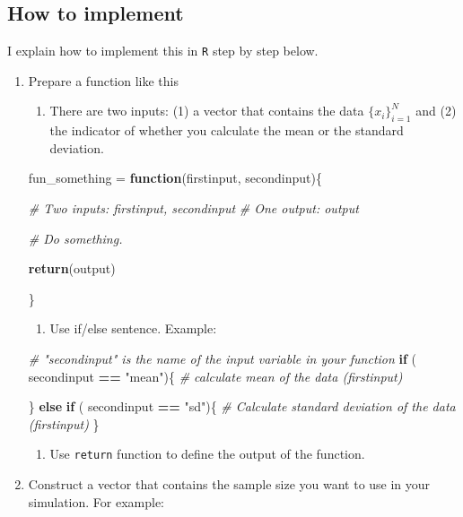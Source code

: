 \documentclass[]{book}
\newenvironment{Shaded}{\begin{snugshade}}{\end{snugshade}}
\newcommand{\CommentTok}[1]{\textcolor[rgb]{0.56,0.35,0.01}{\textit{#1}}}
\newcommand{\ControlFlowTok}[1]{\textcolor[rgb]{0.13,0.29,0.53}{\textbf{#1}}}
\newcommand{\KeywordTok}[1]{\textcolor[rgb]{0.13,0.29,0.53}{\textbf{#1}}}
\newcommand{\NormalTok}[1]{#1}
\newcommand{\OperatorTok}[1]{\textcolor[rgb]{0.81,0.36,0.00}{\textbf{#1}}}
\newcommand{\StringTok}[1]{\textcolor[rgb]{0.31,0.60,0.02}{#1}}
\providecommand{\tightlist}{%
  \setlength{\itemsep}{0pt}\setlength{\parskip}{0pt}}
\begin{document}
\hypertarget{how-to-implement}{%
\subsection{How to implement}\label{how-to-implement}}

I explain how to implement this in \texttt{R} step by step below.

\begin{enumerate}
\def\labelenumi{\arabic{enumi}.}
\tightlist
\item
  Prepare a function like this

  \begin{enumerate}
  \def\labelenumii{\arabic{enumii}.}
  \tightlist
  \item
    There are two inputs: (1) a vector that contains the data \(\{x_{i}\}_{i=1}^{N}\) and (2) the indicator of whether you calculate the mean or the standard deviation.
  \end{enumerate}

\begin{Shaded}
\begin{Highlighting}[]
\NormalTok{fun_something =}\StringTok{ }\ControlFlowTok{function}\NormalTok{(firstinput, secondinput)\{}

  \CommentTok{# Two inputs: firstinput, secondinput}
  \CommentTok{# One output: output}

  \CommentTok{# Do something.}

  \KeywordTok{return}\NormalTok{(output)}

\NormalTok{\}}
\end{Highlighting}
\end{Shaded}

  \begin{enumerate}
  \def\labelenumii{\arabic{enumii}.}
  \setcounter{enumii}{1}
  \tightlist
  \item
    Use if/else sentence. Example:
  \end{enumerate}

\begin{Shaded}
\begin{Highlighting}[]
\CommentTok{# "secondinput" is the name of the input variable in your function}
\ControlFlowTok{if}\NormalTok{ ( secondinput }\OperatorTok{==}\StringTok{ "mean"}\NormalTok{)\{}
  \CommentTok{# calculate mean of the data (firstinput)}

\NormalTok{\} }\ControlFlowTok{else} \ControlFlowTok{if}\NormalTok{ ( secondinput }\OperatorTok{==}\StringTok{ "sd"}\NormalTok{)\{}
  \CommentTok{# Calculate standard deviation of the data (firstinput) }
\NormalTok{\}    }
\end{Highlighting}
\end{Shaded}

  \begin{enumerate}
  \def\labelenumii{\arabic{enumii}.}
  \setcounter{enumii}{2}
  \tightlist
  \item
    Use \texttt{return} function to define the output of the function.
  \end{enumerate}
\item
  Construct a vector that contains the sample size you want to use in your simulation. For example:
\end{enumerate}
\end{document}
